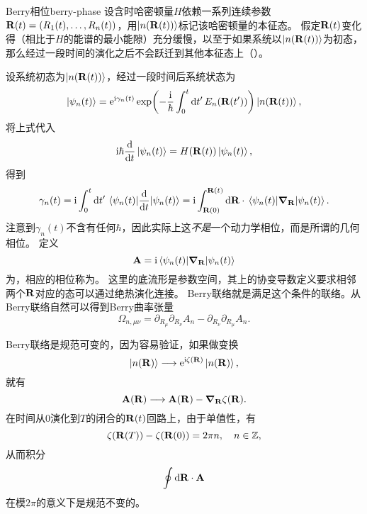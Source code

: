\begin{back}{Berry相位}{berry-phase}
    设含时哈密顿量$H$依赖一系列连续参数$\vb{R}(t) = (R_1(t), \ldots, R_n(t))$，用$\ket{n(\vb{R}(t))}$标记该哈密顿量的本征态。
    假定$\vb{R}(t)$变化得（相比于$H$的能谱的最小能隙）充分缓慢，以至于如果系统以$\ket{n(\vb{R}(t))}$为初态，那么经过一段时间的演化之后不会跃迁到其他本征态上（）。
    
    设系统初态为$\ket{n(\vb{R}(t))}$，经过一段时间后系统状态为
    \begin{equation}
        \ket{\psi_n(t)} = \mathrm{e}^{\mathrm{i} \gamma_n(t)} \exp(-\frac{\mathrm{i}}{\hbar} \int_0^t \dd{t'} E_n(\vb{R}(t'))) \ket{n(\vb{R}(t))},
    \end{equation}
    将上式代入
    \[
        \mathrm{i} \hbar \dv{t} \ket{\psi_n(t)} = H(\vb{R}(t)) \ket{\psi_n(t)},
    \]
    得到
    \begin{equation}
        \gamma_n(t) = \mathrm{i} \int_0^t \dd{t'} \mel*{\psi_n(t)}{\dv{t}}{\psi_n(t)} = \mathrm{i} \int_{\vb{R}(0)}^{\vb{R}(t)} \dd{\vb{R}} \cdot \mel*{\psi_n(t)}{\grad_{\vb{R}}}{\psi_n(t)} .
    \end{equation}
    注意到$\gamma_n(t)$不含有任何$\hbar$，因此实际上这\emph{不是}一个动力学相位，而是所谓的几何相位。
    定义
    \begin{equation}
        \vb{A} = \mathrm{i} \mel*{\psi_n(t)}{\grad_{\vb{R}}}{\psi_n(t)} 
    \end{equation}
    为，相应的相位称为。
    这里的底流形是参数空间，其上的协变导数定义要求相邻两个$\vb{R}$对应的态可以通过绝热演化连接。
    Berry联络就是满足这个条件的联络。从Berry联络自然可以得到Berry曲率张量
    \begin{equation}
        \Omega_{n, \mu \nu} = \partial_{R_\mu} \partial_{R_\nu} A_n - \partial_{R_\nu} \partial_{R_\mu} A_n.
    \end{equation}
    
    Berry联络是规范可变的，因为容易验证，如果做变换
    \begin{equation}
        \ket{n(\vb{R})} \longrightarrow \mathrm{e}^{\mathrm{i} \zeta(\vb{R})} \ket{n(\vb{R})}, 
    \end{equation}
    就有
    \begin{equation}
        \vb{A}(\vb{R}) \longrightarrow \vb{A}(\vb{R}) - \grad_{\vb{R}} \zeta(\vb{R}).
    \end{equation}
    在时间从$0$演化到$T$的闭合的$\vb{R}(t)$回路上，由于单值性，有
    \[
        \zeta(\vb{R}(T)) - \zeta(\vb{R}(0)) = 2 \pi n, \quad n \in \mathbb{Z},
    \]
    从而积分
    \begin{equation}
        \oint \dd{\vb{R}} \cdot \vb{A}
    \end{equation}
    在模$2\pi$的意义下是规范不变的。


\end{back}
